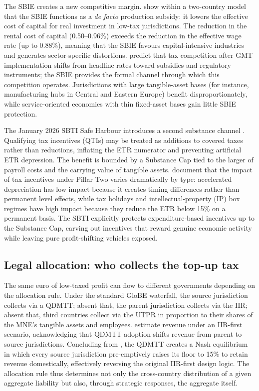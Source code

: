 \documentclass[11pt,a4paper]{article}
\begin{document}
The SBIE creates a new competitive margin. \citet{schjelderup2024} show within a two-country model that the SBIE functions as a \textit{de facto} production subsidy: it lowers the effective cost of capital for real investment in low-tax jurisdictions. The reduction in the rental cost of capital (0.50--0.96\%) exceeds the reduction in the effective wage rate (up to 0.88\%), meaning that the SBIE favours capital-intensive industries and generates sector-specific distortions. \citet{janeba2023} predict that tax competition after GMT implementation shifts from headline rates toward subsidies and regulatory instruments; the SBIE provides the formal channel through which this competition operates. Jurisdictions with large tangible-asset bases (for instance, manufacturing hubs in Central and Eastern Europe) benefit disproportionately, while service-oriented economies with thin fixed-asset bases gain little SBIE protection.

The January 2026 SBTI Safe Harbour introduces a second substance channel \citep{oecd2026}. Qualifying tax incentives (QTIs) may be treated as additions to covered taxes rather than reductions, inflating the ETR numerator and preventing artificial ETR depression. The benefit is bounded by a Substance Cap tied to the larger of payroll costs and the carrying value of tangible assets. \citet{ferreiraliotti2022} document that the impact of tax incentives under Pillar Two varies dramatically by type: accelerated depreciation has low impact because it creates timing differences rather than permanent level effects, while tax holidays and intellectual-property (IP) box regimes have high impact because they reduce the ETR below 15\% on a permanent basis. The SBTI explicitly protects expenditure-based incentives up to the Substance Cap, carving out incentives that reward genuine economic activity while leaving pure profit-shifting vehicles exposed. 

\subsection{Legal allocation: who collects the top-up tax}\label{sec:allocation_lit}

The same euro of low-taxed profit can flow to different governments depending on the allocation rule. Under the standard GloBE waterfall, the source jurisdiction collects via a QDMTT; absent that, the parent jurisdiction collects via the IIR; absent that, third countries collect via the UTPR in proportion to their shares of the MNE's tangible assets and employees. \citet{barake2022} estimate revenue under an IIR-first scenario, acknowledging that QDMTT adoption shifts revenue from parent to source jurisdictions. Concluding from \citet{devereux2022}, the QDMTT creates a Nash equilibrium in which every source jurisdiction pre-emptively raises its floor to 15\% to retain revenue domestically, effectively reversing the original IIR-first design logic. The allocation rule thus determines not only the cross-country distribution of a given aggregate liability but also, through strategic responses, the aggregate itself.
\end{document}
